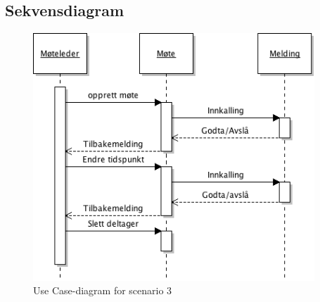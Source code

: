 \subsection{Sekvensdiagram}
\begin{figure}[H]
\label{fig:sek3}
\includegraphics[width=400px]{sekvens3.png}
\caption{Use Case-diagram for scenario 3}
\end{figure}